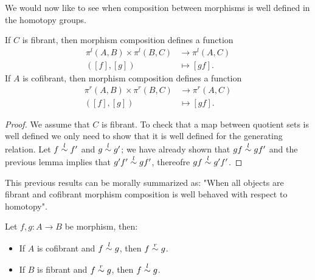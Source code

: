 We would now like to see when composition between morphisms is well defined in the homotopy groups.

\begin{lemma}
	\label{lem:model-composition}
	If $C$ is fibrant, then morphism composition defines a function
	\begin{align*}
		\pi^l(A,B) \times  \pi^l(B,C) &\longrightarrow \pi^l(A,C)  \\
		([f],[g]) & \mapsto [gf].
	\end{align*}
	If $A$ is cofibrant, then morphism composition defines a function
	\begin{align*}
		\pi^r(A,B) \times  \pi^r(B,C) &\longrightarrow \pi^r(A,C)  \\
		([f],[g]) & \mapsto [gf].
	\end{align*}
\end{lemma}
\begin{proof}
	We assume that $C$ is fibrant. To check that a map between quotient sets is well defined we only need to show that it is well defined for the generating relation. Let $f\mathrel{\overset{l}{\sim}} f'$ and $g \mathrel{\overset{l}{\sim}} g'$; we have already shown that $gf \mathrel{\overset{l}{\sim}} gf'$ and the previous lemma implies that $g'f' \mathrel{\overset{l}{\sim}} gf'$, thereofre $gf \mathrel{\overset{l}{\sim}} g'f'$.
\end{proof}

This previous results can be morally summarized as: "When all objects are fibrant and cofibrant morphism composition is well behaved with respect to homotopy".

\begin{proposition}
	\label{prop:right-left}
	Let $f,g \colon A \longrightarrow B$ be morphism, then:
	\begin{itemize}
		\item If $A$ is cofibrant and $f\mathrel{\overset{l}{\sim}} g$, then $f \mathrel{\overset{r}{\sim}} g$.
		\item If $B$ is fibrant and $f\mathrel{\overset{r}{\sim}} g$, then $f \mathrel{\overset{l}{\sim}} g$.
	\end{itemize}
\end{proposition}

